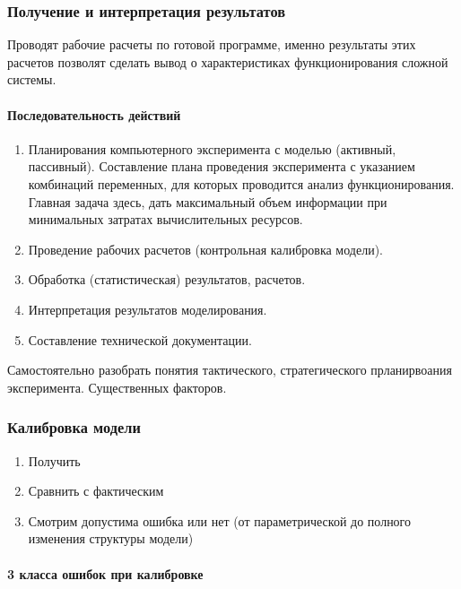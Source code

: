 \subsubsection{Получение и интерпретация результатов}

Проводят рабочие расчеты по готовой программе, именно результаты этих расчетов позволят сделать вывод о характеристиках функционирования сложной системы.

\paragraph{Последовательность действий}

\begin{enumerate}
    \item Планирования компьютерного эксперимента с моделью (активный, пассивный). Составление плана проведения эксперимента с указанием комбинаций переменных, для которых проводится анализ функционирования. Главная задача здесь, дать максимальный объем информации при минимальных затратах вычислительных ресурсов.
    \item Проведение рабочих расчетов (контрольная калибровка модели).
    \item Обработка (статистическая) результатов, расчетов.
    \item Интерпретация результатов моделирования.
    \item Составление технической документации.
\end{enumerate}

Самостоятельно разобрать понятия тактического, стратегического прланирвоания эксперимента. Существенных факторов.

\subsubsection{Калибровка модели}

\begin{enumerate}
    \item Получить
    \item Сравнить с фактическим
    \item Смотрим допустима ошибка или нет (от параметрической до полного изменения структуры модели)
\end{enumerate}

\paragraph{3 класса ошибок при калибровке}


